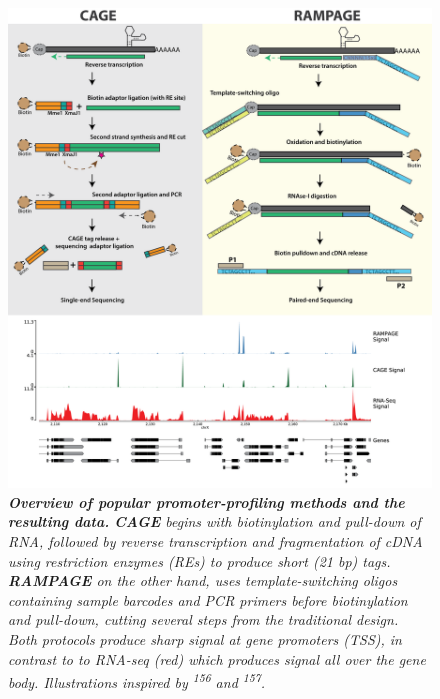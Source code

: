 \documentclass[11pt,twoside]{MPIthesis}
\theoremstyle{definition}
\theoremstyle{definition}
\theoremstyle{definition}
\theoremstyle{remark}
\begin{document}
\clearpage
\begin{figure}

{\centering \includegraphics[width=0.8\linewidth]{figures/intro_fig5} 

}

\caption[Overview of popular promoter-profiling methods and the resulting data]{\emph{\textbf{Overview of popular promoter-profiling methods
and the resulting data.} \textbf{CAGE} begins with biotinylation and
pull-down of RNA, followed by reverse transcription and fragmentation of
cDNA using restriction enzymes (REs) to produce short (21 bp) tags.
\textbf{RAMPAGE} on the other hand, uses template-switching oligos
containing sample barcodes and PCR primers before biotinylation and
pull-down, cutting several steps from the traditional design. Both
protocols produce sharp signal at gene promoters (TSS), in contrast to
to RNA-seq (red) which produces signal all over the gene body.
Illustrations inspired by \textsuperscript{156} and
\textsuperscript{157}.}}\label{fig:unnamed-chunk-5}
\end{figure}
\end{document}
